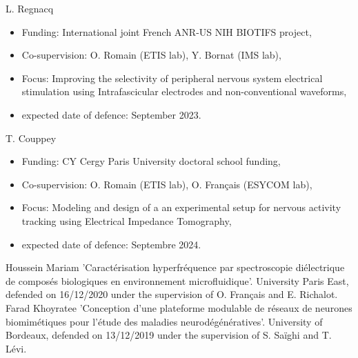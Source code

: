 
\begin{cvskills}
  \cvskill
    {L. Regnacq} %
    {\begin{itemize}
    	\item Funding: International joint French ANR-US NIH BIOTIFS project,
    	\item Co-supervision: O. Romain (ETIS lab), Y. Bornat (IMS lab),
    	\item Focus: Improving the selectivity of peripheral nervous system electrical stimulation using Intrafascicular electrodes and non-conventional waveforms,
    	\item expected date of defence: September 2023.
    \end{itemize}
    } %
  \cvskill
    {T. Couppey} %
    {\begin{itemize}
    	\item Funding: CY Cergy Paris University doctoral school funding,
    	\item Co-supervision: O. Romain (ETIS lab), O. Français (ESYCOM lab),
    	\item Focus: Modeling and design of a an experimental setup for nervous activity tracking using Electrical Impedance Tomography,
    	\item expected date of defence: Septembre 2024.
    \end{itemize}
    } %
\end{cvskills}

\begin{cvskills}
\cvskill
    {Houssein Mariam} %
    {'Caractérisation hyperfréquence par spectroscopie diélectrique de composés biologiques en environnement microfluidique'. University Paris East, defended on  16/12/2020 under the supervision of O. Français and E. Richalot.
    } %
\cvskill
    {Farad Khoyratee} %
    {'Conception d’une plateforme modulable de réseaux de neurones biomimétiques pour l’étude des maladies neurodégénératives'. University of Bordeaux, defended on 13/12/2019 under the supervision of S. Saïghi and T. Lévi.
    } %
\end{cvskills}